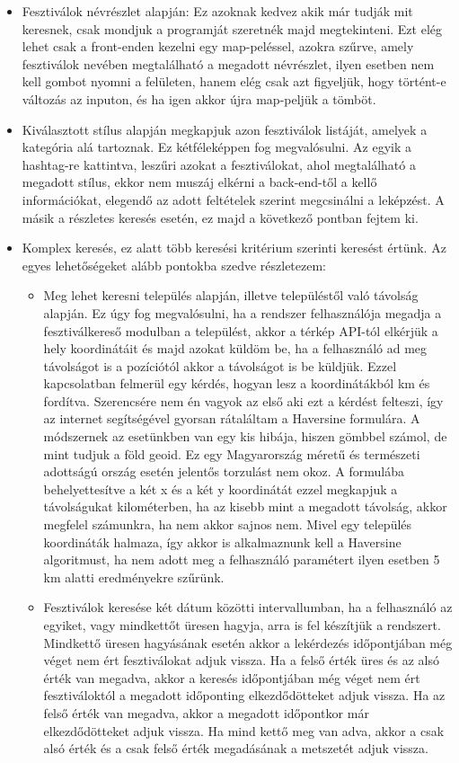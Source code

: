 \begin{itemize}
\item Fesztiválok névrészlet alapján:  Ez azoknak kedvez akik már tudják mit keresnek, csak mondjuk a programját szeretnék majd megtekinteni. Ezt elég lehet csak a front-enden kezelni egy map-peléssel, azokra szűrve, amely fesztiválok nevében megtalálható a megadott névrészlet, ilyen esetben nem kell gombot nyomni a felületen, hanem elég csak azt figyeljük, hogy történt-e változás az inputon, és ha igen akkor újra map-peljük a tömböt.

\item Kiválasztott stílus alapján megkapjuk azon fesztiválok listáját, amelyek a kategória alá tartoznak. Ez kétféleképpen fog megvalósulni. Az egyik a hashtag-re kattintva, leszűri azokat a fesztiválokat, ahol megtalálható a megadott stílus, ekkor nem muszáj elkérni a back-end-től a kellő információkat, elegendő az adott feltételek szerint megcsinálni a leképzést. A másik a részletes keresés esetén, ez majd a következő pontban fejtem ki.

\item Komplex keresés, ez alatt több keresési kritérium szerinti keresést értünk. Az egyes lehetőségeket alább pontokba szedve részletezem: 
\begin{itemize}
\item Meg lehet keresni település alapján, illetve településtől való távolság alapján. Ez úgy fog megvalósulni, ha a rendszer felhasználója megadja a fesztiválkereső modulban a települést, akkor a térkép API-tól elkérjük a hely koordinátáit és majd azokat küldöm be, ha a felhasználó ad meg távolságot is a pozíciótól akkor a távolságot is be küldjük. Ezzel kapcsolatban felmerül egy kérdés, hogyan lesz a koordinátákból km és fordítva. Szerencsére nem én vagyok az első aki ezt a kérdést felteszi, így az internet segítségével gyorsan rátaláltam a Haversine formulára. A módszernek az esetünkben van egy kis hibája, hiszen gömbbel számol, de mint tudjuk a föld geoid. Ez egy Magyarország méretű és természeti adottságú ország esetén jelentős torzulást nem okoz. A formulába behelyettesítve a két x és a két y koordinátát ezzel megkapjuk a távolságukat kilométerben, ha az kisebb mint a megadott távolság, akkor megfelel számunkra, ha nem akkor sajnos nem. Mivel egy település koordináták halmaza, így akkor is alkalmaznunk kell a Haversine algoritmust, ha nem adott meg a felhasználó paramétert ilyen esetben 5 km alatti eredményekre szűrünk. 

\item Fesztiválok keresése két dátum közötti intervallumban, ha a felhasználó az egyiket, vagy mindkettőt üresen hagyja, arra is fel készítjük a rendszert. Mindkettő üresen hagyásának esetén akkor a lekérdezés időpontjában még véget nem ért fesztiválokat adjuk vissza. Ha a felső érték üres és az alsó érték van megadva, akkor a keresés időpontjában még véget nem ért fesztiváloktól a megadott időponting elkezdődötteket adjuk vissza. Ha az felső érték van megadva, akkor a megadott időpontkor már elkezdődötteket adjuk vissza. Ha mind kettő meg van adva, akkor a csak alsó érték és a csak felső érték megadásának a metszetét adjuk vissza.


\end{itemize}
\end{itemize}
